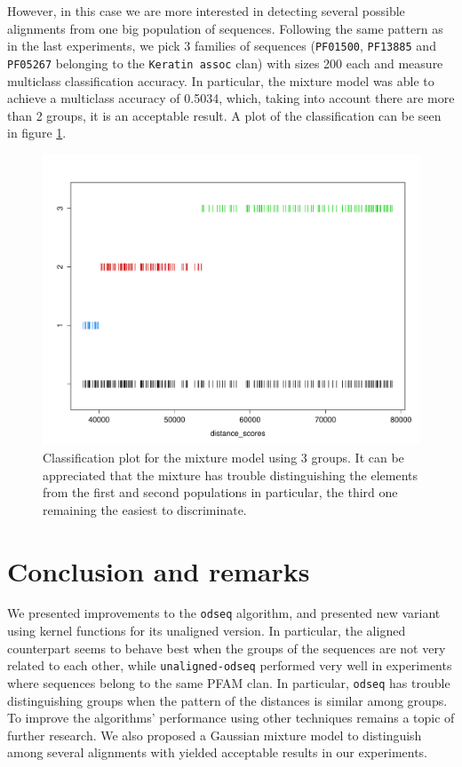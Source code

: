 \documentclass[a4paper]{llncs}
\begin{document}
However, in this case we are more interested in detecting several possible alignments from one big population of sequences. Following the same pattern as in the last experiments, we pick 3 families of sequences (\texttt{PF01500}, \texttt{PF13885} and \texttt{PF05267} belonging to the \texttt{Keratin assoc} clan) with sizes 200 each and measure multiclass classification accuracy. In particular, the mixture model was able to achieve a multiclass accuracy of 0.5034, which, taking into account there are more than 2 groups, it is an acceptable result. A plot of the classification can be seen in figure  \ref{fig:class_mix}.

\begin{figure}
\centering
\includegraphics[scale=0.3]{pics/class_mix}
\caption{Classification plot for the mixture model using 3 groups. It can be appreciated that the mixture has trouble distinguishing the elements from the first and second populations in particular, the third one remaining the easiest to discriminate.}
\label{fig:class_mix}
\end{figure}


\section{Conclusion and remarks}

We presented improvements to the \texttt{odseq} algorithm, and presented new variant using kernel functions for its unaligned version. In particular, the aligned counterpart seems to behave best when the groups of the sequences are not very related to each other, while \texttt{unaligned-odseq} performed very well in experiments where sequences belong to the same PFAM clan. In particular, \texttt{odseq} has trouble distinguishing groups when the pattern of the distances is similar among groups. To improve the algorithms' performance using other techniques remains a topic of further research. We also proposed a Gaussian mixture model to distinguish among several alignments with yielded acceptable results in our experiments.

\nocite{*}
{}

\end{document}
